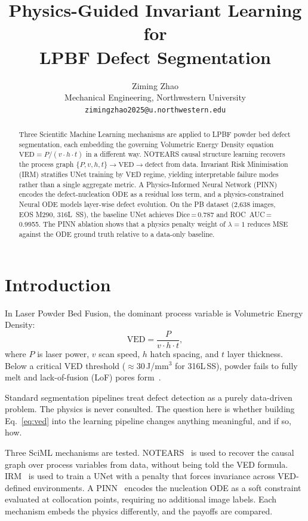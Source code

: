 \documentclass[10pt,twocolumn]{article}
\title{\vspace{-1.5em}
\textbf{Physics-Guided Invariant Learning for\\LPBF Defect Segmentation}
\vspace{-0.5em}}
\author{
Ziming Zhao\\
\small Mechanical Engineering, Northwestern University\\
\small \texttt{zimingzhao2025@u.northwestern.edu}
}
\date{\vspace{-1em}}
\begin{document}
\maketitle
\thispagestyle{empty}

\begin{abstract}
\noindent
Three Scientific Machine Learning mechanisms are applied to LPBF
powder bed defect segmentation, each embedding the governing
Volumetric Energy Density equation $\text{VED}=P/(v\cdot h\cdot t)$
in a different way. NOTEARS causal structure learning recovers the
process graph $\{P,v,h,t\}\to\text{VED}\to\text{defect}$ from data.
Invariant Risk Minimisation (IRM) stratifies UNet training by VED
regime, yielding interpretable failure modes rather than a single
aggregate metric. A Physics-Informed Neural Network (PINN) encodes
the defect-nucleation ODE as a residual loss term, and a
physics-constrained Neural ODE models layer-wise defect evolution.
On the PB dataset (2,638 images, EOS M290, 316L~SS), the baseline
UNet achieves Dice\,=\,0.787 and ROC~AUC\,=\,0.9955.
The PINN ablation shows that a physics penalty weight of
$\lambda=1$ reduces MSE against the ODE ground truth relative to
a data-only baseline.
\end{abstract}

\section{Introduction}

In Laser Powder Bed Fusion, the dominant process variable is
Volumetric Energy Density:
\begin{equation}
  \text{VED} = \frac{P}{v \cdot h \cdot t},
  \label{eq:ved}
\end{equation}
where $P$ is laser power, $v$ scan speed, $h$ hatch spacing, and
$t$ layer thickness. Below a critical VED threshold
($\approx 30$\,J/mm$^3$ for 316L\,SS), powder fails to fully melt
and lack-of-fusion (LoF) pores form~\cite{debroy2018}.

Standard segmentation pipelines treat defect detection as a purely
data-driven problem. The physics is never consulted. The question
here is whether building Eq.~\eqref{eq:ved} into the learning
pipeline changes anything meaningful, and if so, how.

Three SciML mechanisms are tested. NOTEARS~\cite{zheng2018} is used
to recover the causal graph over process variables from data, without
being told the VED formula. IRM~\cite{arjovsky2019} is used to train
a UNet with a penalty that forces invariance across VED-defined
environments. A PINN~\cite{raissi2019} encodes the nucleation ODE as
a soft constraint evaluated at collocation points, requiring no
additional image labels. Each mechanism embeds the physics
differently, and the payoffs are compared.
\end{document}
